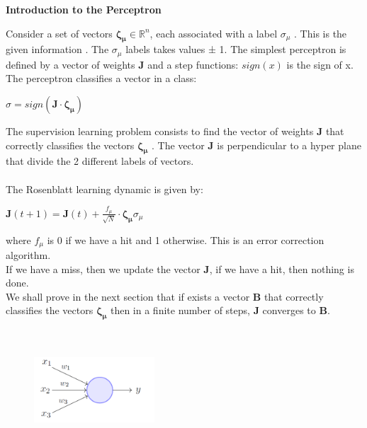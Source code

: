 \documentclass[paper=9in:6in,pagesize=pdftex,headinclude=on,footinclude=on,10pt,bibtotoc,pointlessnumbers,normalheadings,DIV=9,twoside=false]{scrbook}
\begin{document}
\date{}

\begin{center}
\begin{large}
 \textbf{Introduction to the Perceptron\\}
\end{large}
\end{center}
\begin{text} 
Consider a set of vectors $\boldsymbol{\zeta_{\mu}} \in \mathbb{R}^n$, each associated with a
label $\sigma_{\mu}$ .
This is the given information . The $\sigma_{\mu}$ labels takes values ± 1. The simplest perceptron is defined
by a vector of weights \textbf{J} and a  
step functions: $sign(x)$ is the sign of x. The perceptron classifies a vector in a class:
\end{text}
\begin{center}
    $\sigma=sign( \textbf{J} \cdot \boldsymbol{\zeta_{\mu}})$ \\
\end{center}

\begin{text}
The supervision learning problem consists to find the vector of weights \textbf{J} that correctly classifies the vectors $\boldsymbol{\zeta_{\mu}}$ . The vector \textbf{J} is perpendicular to a hyper plane that divide the 2 different labels of vectors.\\
\ \\
\indent The Rosenblatt learning dynamic is given by:
\end{text}

\begin{center}
    $\mathbf{J}(t+1) = \mathbf{J}(t) + \frac{f_\mu}{\sqrt{N}} \cdot  \boldsymbol{\zeta_{\mu}}\sigma_{\mu}$
\end{center}

\begin{text}
where $f_\mu$ is 0 if we have a hit and 1 otherwise. This is an error correction algorithm. \\
\indent If we have a miss, then we update the vector \textbf{J}, if we have a hit, then nothing is done. \\
\indent We shall prove in the next section that if exists a vector \textbf{B} that correctly classifies the vectors $\boldsymbol{\zeta_{\mu}}$ then in a finite number of steps, \textbf{J} converges to \textbf{B}. \\
\ \\
\ \\
\end{text}

\begin{figure}[htb!]
    \centering
    \includegraphics[width=0.4\textwidth]{Screenshot_25.png}
\end{figure}
\end{document}
